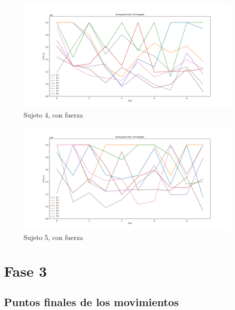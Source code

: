 \documentclass[a4paper,11pt, oneside]{book}
\begin{document}
\begin{figure}[H]
	\includegraphics[width=\linewidth]{sujeto4/force/evolution_time}
	\caption{Sujeto 4, con fuerza}
	\label{4-2-3}
\end{figure}
\begin{figure}[H]
	\includegraphics[width=\linewidth]{sujeto5/force/evolution_time}
	\caption{Sujeto 5, con fuerza}
	\label{5-2-3}
\end{figure}



\section{Fase 3}

\subsection{Puntos finales de los movimientos}
\label{anexo:5}
\end{document}
